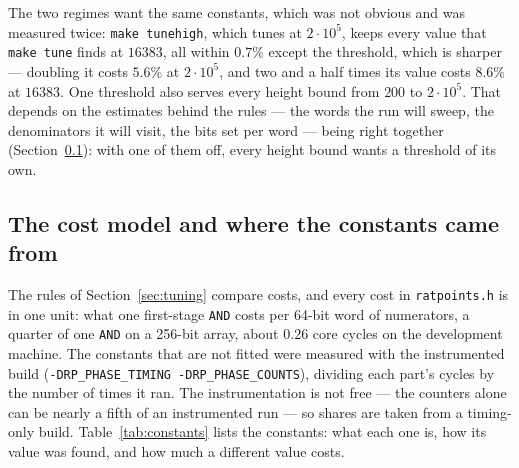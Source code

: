 \documentclass[12pt,a4paper,oneside]{amsart}
\begin{document}
The two regimes want the same constants, which was not obvious and was
measured twice: \texttt{make tunehigh}, which tunes at $2\cdot10^5$, keeps
every value that \texttt{make tune} finds at $16383$, all within $0.7\%$
except the threshold, which is sharper --- doubling it costs $5.6\%$ at
$2\cdot10^5$, and two and a half times its value costs $8.6\%$ at $16383$.
One threshold also serves every height bound from $200$ to $2\cdot10^5$.
That depends on the estimates behind the rules --- the words the run will
sweep, the denominators it will visit, the bits set per word --- being right
together (Section~\ref{app:model}): with one of them off, every height
bound wants a threshold of its own.

\subsection{The cost model and where the constants came from}\label{app:model}

The rules of Section~\ref{sec:tuning} compare costs, and every cost in
\texttt{ratpoints.h} is in one unit: what one first-stage \texttt{AND} costs
per 64-bit word of numerators, a quarter of one \texttt{AND} on a 256-bit
array, about $0.26$ core cycles on the development machine. The constants
that are not fitted were measured with the instrumented build
(\texttt{-DRP\_PHASE\_TIMING -DRP\_PHASE\_COUNTS}), dividing each part's
cycles by the number of times it ran. The instrumentation is not free ---
the counters alone can be nearly a fifth of an instrumented run --- so shares are
taken from a timing-only build. Table~\ref{tab:constants} lists the
constants: what each one is, how its value was found, and how much a
different value costs.
\end{document}
